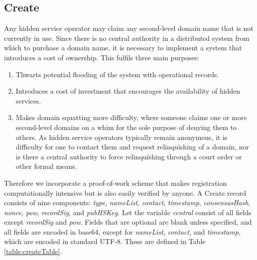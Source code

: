 \subsection{Create}

Any hidden service operator may claim any second-level domain name that is not currently in use. Since there is no central authority in a distributed system from which to purchase a domain name, it is necessary to implement a system that introduces a cost of ownership. This fulfils three main purposes: 

\begin{enumerate}
	\item Thwarts potential flooding of the system with operational records.
	\item Introduces a cost of investment that encourages the availability of hidden services.
	\item Makes domain squatting more difficulty, where someone claims one or more second-level domains on a whim for the sole purpose of denying them to others. As hidden service operators typically remain anonymous, it is difficulty for one to contact them and request relinquishing of a domain, nor is there a central authority to force relinquishing through a court order or other formal means.
\end{enumerate}

Therefore we incorporate a proof-of-work scheme that makes registration computationally intensive but is also easily verified by anyone. A Create record consists of nine components: \emph{type}, \emph{nameList}, \emph{contact}, \emph{timestamp}, \emph{consensusHash}, \emph{nonce}, \emph{pow}, \emph{recordSig}, and \emph{pubHSKey}. Let the variable \emph{central} consist of all fields except \emph{recordSig} and \emph{pow}. Fields that are optional are blank unless specified, and all fields are encoded in base64, except for \emph{nameList}, \emph{contact}, and \emph{timestamp}, which are encoded in standard UTF-8. These are defined in Table \ref{table:createTable}.

